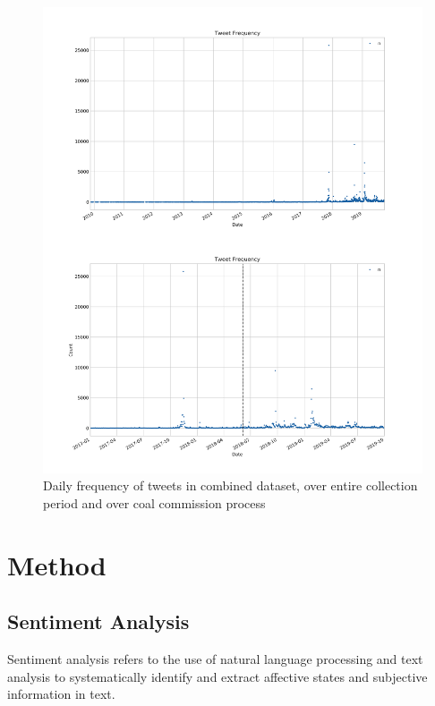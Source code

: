 \documentclass[10pt,twocolumn,twoside,lineno]{pnas-new}
\begin{document}
\begin{figure} 
	\begin{center}
		\includegraphics[width=\linewidth]{figures/tweet_frequency_combine}
	\end{center}
	\caption{Daily frequency of tweets in combined dataset, over entire collection period and over coal commission process}
	\label{fig:tweet_frequency}
\end{figure}

\section*{Method} \label{sec:method}
\subsection*{Sentiment Analysis}

Sentiment analysis refers to the use of natural language processing and text analysis to systematically identify and extract affective states and subjective information in text. %
\end{document}
